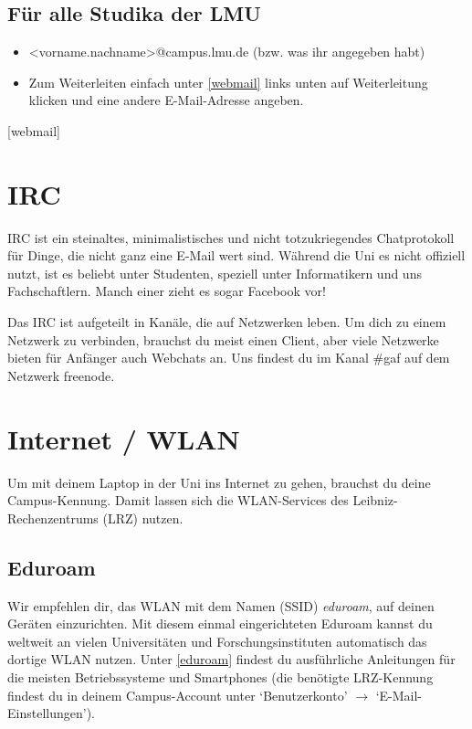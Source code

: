 \subsection*{Für alle Studika der LMU}
\begin{itemize}
	\item <vorname.nachname>@campus.lmu.de (bzw. was ihr angegeben habt)
	\item Zum Weiterleiten einfach unter \ref{webmail} links unten auf Weiterleitung klicken und eine andere E-Mail-Adresse angeben.
\end{itemize}
\begin{urlList}
	[webmail]
\end{urlList}

\section{IRC}
IRC ist ein steinaltes, minimalistisches und nicht totzukriegendes
Chatprotokoll für Dinge, die nicht ganz eine E-Mail wert sind. Während die Uni
es nicht offiziell nutzt, ist es beliebt unter Studenten, speziell unter
Informatikern und uns Fachschaftlern. Manch einer zieht es sogar Facebook vor!

Das IRC ist aufgeteilt in Kanäle, die auf Netzwerken leben. Um dich zu einem
Netzwerk zu verbinden, brauchst du meist einen Client, aber viele Netzwerke
bieten für Anfänger auch Webchats an. Uns findest du im Kanal \#gaf auf dem
Netzwerk freenode.

\begin{urlList}
\end{urlList}



\section{Internet / WLAN}
Um mit deinem Laptop in der Uni ins Internet zu gehen, brauchst du
deine Campus-Kennung. Damit lassen sich die WLAN-Services des
Leibniz-Rechen\-zentrums (LRZ) nutzen.

\subsection*{Eduroam}
Wir empfehlen dir, das WLAN mit dem Namen (SSID) \emph{eduroam}, auf deinen Geräten einzurichten. Mit diesem einmal eingerichteten Eduroam kannst du weltweit an vielen Universitäten und Forschungsinstituten automatisch das dortige WLAN nutzen. Unter \ref{eduroam} findest du ausführliche Anleitungen für die meisten Betriebssysteme und Smart\-phones 
(die benötigte LRZ-Kennung findest du in deinem Campus-Account unter `Benutzerkonto' $\rightarrow$ `E-Mail-Einstellungen').

